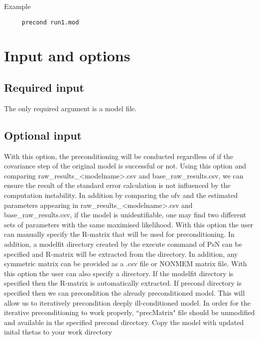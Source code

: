 Example 

\begin{verbatim}
     precond run1.mod
\end{verbatim}

\section{Input and options}

\subsection{Required input}
The only required argument is a model file.

\subsection{Optional input}

\begin{optionlist}
With this option, the preconditioning will be conducted regardless of if the covariance step of the original model is successful or not.  Using this option and comparing raw\_results\_<modelname>.csv and base\_raw\_results.csv, we can ensure the result of the standard error calculation is not influenced by the computation instability.  In addition by comparing the ofv and the estimated parameters appearing in raw\_results\_<modelname>.csv and base\_raw\_results.csv, if the model is unidentifiable, one may find two different sets of parameters with the same maximised likelihood.
\nextopt
{}
With this option the user can manually specify the R-matrix that will be used for preconditioning.  In addition, a modelfit directory created by the execute command of PsN can be specified and R-matrix will be extracted from the directory.  In addition, any symmetric matrix can be provided as a .csv file or NONMEM matrix file.
\nextopt
{}
With this option the user can also specify a directory.  If the modelfit directory is specified then the R-matrix is automatically extracted.  If precond directory is specified then we can precondition the already preconditioned model.  This will allow us to iteratively precondition deeply ill-conditioned model.  In order for the iterative preconditioning to work properly, ``precMatrix" file should be unmodified and available in the specified precond directory.
\nextopt
{}
Copy the model with updated inital thetas to your work directory	
\nextopt
\end{optionlist}

